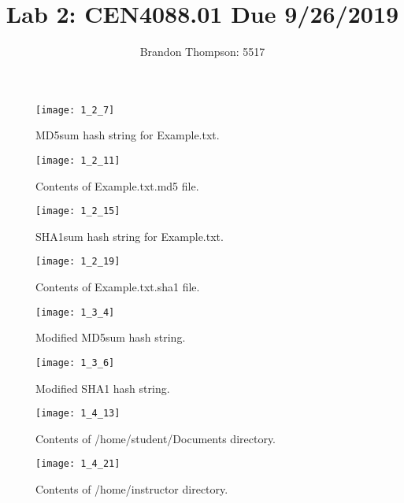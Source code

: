 \documentclass[a4paper]{article}
\begin{document}
	\author{Brandon Thompson: 5517}
	\title{Lab 2: CEN4088.01 Due 9/26/2019}
	\maketitle

	\medskip
	\begin{figure}[ht]
		\centering
		\texttt{[image: 1\_2\_7]}
		\caption{MD5sum hash string for Example.txt.}
		\label{fig:1_2_7}
	\end{figure}

	\begin{figure}[ht]
		\centering
		\texttt{[image: 1\_2\_11]}
		\caption{Contents of Example.txt.md5 file.}
		\label{fig:1_2_11}
	\end{figure}

	\begin{figure}[ht]
		\centering
		\texttt{[image: 1\_2\_15]}
		\caption{SHA1sum hash string for Example.txt.}
		\label{fig:1_2_15}
	\end{figure}
	
	\begin{figure}[ht]
		\centering
		\texttt{[image: 1\_2\_19]}
		\caption{Contents of Example.txt.sha1 file.}
		\label{fig:1_2_19}
	\end{figure}
	
	\begin{figure}[ht]
		\centering
		\texttt{[image: 1\_3\_4]}
		\caption{Modified MD5sum hash string.}
		\label{fig:1_3_4}
	\end{figure}

	\begin{figure}[ht]
		\centering
		\texttt{[image: 1\_3\_6]}
		\caption{Modified SHA1 hash string.}
		\label{fig:1_3_6}
	\end{figure}

	\begin{figure}[ht]
		\centering
		\texttt{[image: 1\_4\_13]}
		\caption{Contents of /home/student/Documents directory.}
		\label{fig:1_4_13}
	\end{figure}

	\begin{figure}[ht]
		\centering
		\texttt{[image: 1\_4\_21]}
		\caption{Contents of /home/instructor directory.}
		\label{fig:1_4_21}
	\end{figure}
\end{document}
